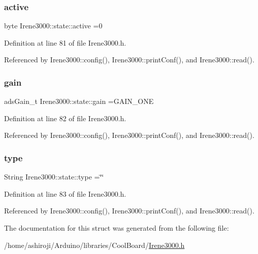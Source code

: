 \subsubsection{\texorpdfstring{active}{active}}
{\footnotesize\ttfamily byte Irene3000\+::state\+::active =0}



Definition at line 81 of file Irene3000.\+h.



Referenced by Irene3000\+::config(), Irene3000\+::print\+Conf(), and Irene3000\+::read().

\mbox{\label{structIrene3000_1_1state_a1ecf69d38cb31ecaf6b3602a3f3e93cb}} 
\subsubsection{\texorpdfstring{gain}{gain}}
{\footnotesize\ttfamily ads\+Gain\+\_\+t Irene3000\+::state\+::gain =G\+A\+I\+N\+\_\+\+O\+NE}



Definition at line 82 of file Irene3000.\+h.



Referenced by Irene3000\+::config(), Irene3000\+::print\+Conf(), and Irene3000\+::read().

\mbox{\label{structIrene3000_1_1state_a9897a7e02727db6351d44006eec73799}} 
\subsubsection{\texorpdfstring{type}{type}}
{\footnotesize\ttfamily String Irene3000\+::state\+::type =\char`\"{}\char`\"{}}



Definition at line 83 of file Irene3000.\+h.



Referenced by Irene3000\+::config(), Irene3000\+::print\+Conf(), and Irene3000\+::read().



The documentation for this struct was generated from the following file\+:\begin{DoxyCompactItemize}
\item 
/home/ashiroji/\+Arduino/libraries/\+Cool\+Board/\hyperlink{Irene3000_8h}{Irene3000.\+h}\end{DoxyCompactItemize}
